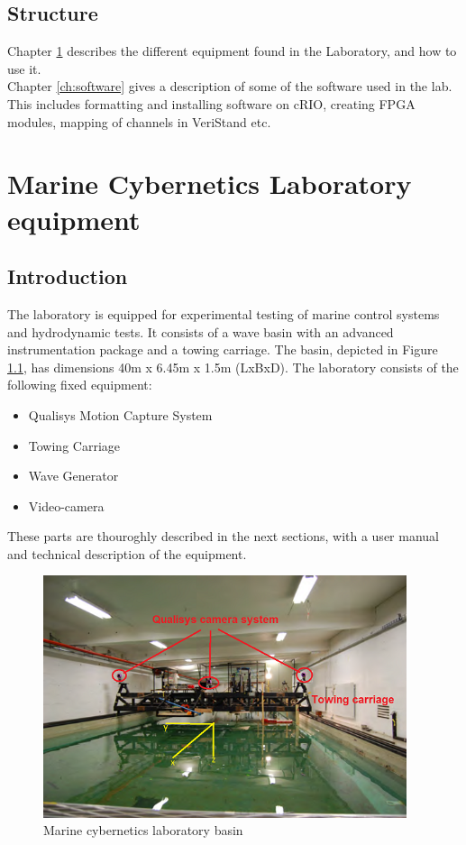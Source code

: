 \documentclass[a4paper,english]{report}
\begin{document}
\section*{Structure}
Chapter \ref{ch:marine_cybernetics_laboratory_equipment} describes the different equipment found in the Laboratory, and how to use it. \\
\noindent
Chapter \ref{ch:software} gives a description of some of the software used in the lab. This includes formatting and installing software on cRIO, creating FPGA modules, mapping of channels in VeriStand etc. 

\newpage{}
\tableofcontents{}
\clearpage
{}
\chapter{Marine Cybernetics Laboratory equipment}\label{ch:marine_cybernetics_laboratory_equipment}
\section{Introduction}
The laboratory is equipped for experimental testing of marine control systems and hydrodynamic tests. It consists of a wave basin with an advanced instrumentation package and a towing carriage. The basin, depicted in Figure \ref{fig: Marine cybernetics laboratory basin-1}, has dimensions 40m x 6.45m x 1.5m (LxBxD). The laboratory consists of the following fixed equipment: 
\begin{itemize}
	\item Qualisys Motion Capture System
	\item Towing Carriage
	\item Wave Generator
	\item Video-camera
\end{itemize}
These parts are thouroghly described in the next sections, with a user manual and technical description of the equipment. 

\begin{figure}[h!]
	\centering \includegraphics[width=0.95\textwidth]{fig/mc_lab} 
	\caption{Marine cybernetics laboratory basin}
	\label{fig: Marine cybernetics laboratory basin-1}
\end{figure}
\end{document}
